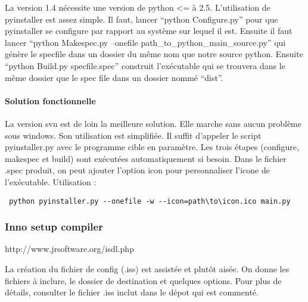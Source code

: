 \documentclass[12pt,a4paper]{article}
\begin{document}
        La version 1.4 nécessite une version de python <= à 2.5. L'utilisation
        de pyinstaller est assez simple. Il faut, lancer ``python Configure.py''
        pour que pyinstaller se configure par rapport au système sur lequel il
        est. Ensuite il faut lancer ``python Makespec.py --onefile
        path\_to\_python\_main\_source.py'' qui génère le specfile dans un
        dossier du même nom que notre source python. Ensuite ``python Build.py
        specfile.spec'' construit l'exécutable qui se trouvera dans le même
        dossier que le spec file dans un dossier nommé ``dist''.

        \paragraph{Solution fonctionnelle}

        La version svn est de loin la meilleure solution. Elle marche sans aucun
        problème sous windows. Son utilisation est simplifi\'ee.  Il suffit
        d'appeler le script pyinstaller.py avec le programme cible en paramètre.
        Les trois \'etapes (configure, makespec et build) sont ex\'ecut\'ees
        automatiquement si besoin. Dans le fichier .spec produit, on peut
        ajouter l'option icon pour personnaliser l'icone de l'ex\'ecutable.
		Utilisation : \begin{verbatim} python pyinstaller.py --onefile -w --icon=path\to\icon.ico main.py \end{verbatim}

        \subsubsection{Inno setup compiler}
        http://www.jrsoftware.org/isdl.php

        La cr\'eation du fichier de config (.iss) est assist\'ee et plutôt
        ais\'ee. On donne les fichiers à inclure, le dossier de destination et
        quelques options. Pour plus de d\'etails, consulter le fichier .iss
        inclut dans le d\'epot qui est comment\'e.
\end{document}
